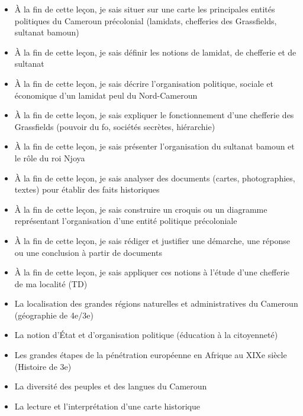 \documentclass[11pt]{article}
\begin{document}
\begin{objectifs}
\begin{itemize}
\item À la fin de cette leçon, je sais situer sur une carte les principales entités politiques du Cameroun précolonial (lamidats, chefferies des Grassfields, sultanat bamoun)
\item À la fin de cette leçon, je sais définir les notions de lamidat, de chefferie et de sultanat
\item À la fin de cette leçon, je sais décrire l'organisation politique, sociale et économique d'un lamidat peul du Nord-Cameroun
\item À la fin de cette leçon, je sais expliquer le fonctionnement d'une chefferie des Grassfields (pouvoir du fo, sociétés secrètes, hiérarchie)
\item À la fin de cette leçon, je sais présenter l'organisation du sultanat bamoun et le rôle du roi Njoya
\item À la fin de cette leçon, je sais analyser des documents (cartes, photographies, textes) pour établir des faits historiques
\item À la fin de cette leçon, je sais construire un croquis ou un diagramme représentant l'organisation d'une entité politique précoloniale
\item À la fin de cette leçon, je sais rédiger et justifier une démarche, une réponse ou une conclusion à partir de documents
\item À la fin de cette leçon, je sais appliquer ces notions à l'étude d'une chefferie de ma localité (TD)
\end{itemize}
\end{objectifs}

\begin{prerequis}
\begin{itemize}
\item La localisation des grandes régions naturelles et administratives du Cameroun (géographie de 4e/3e)
\item La notion d'État et d'organisation politique (éducation à la citoyenneté)
\item Les grandes étapes de la pénétration européenne en Afrique au XIXe siècle (Histoire de 3e)
\item La diversité des peuples et des langues du Cameroun
\item La lecture et l'interprétation d'une carte historique
\end{itemize}
\end{prerequis}
\end{document}
